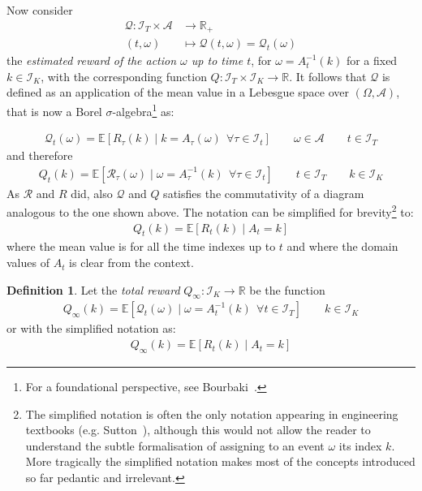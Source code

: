 \documentclass[]{scrartcl}
\theoremstyle{definition}
\newtheorem{definition}{Definition}[section]
\begin{document}
Now consider
\begin{align*}
    \mathcal{Q} : \mathcal{I}_T \times \mathcal{A} &\longrightarrow \mathbb{R}_{+} \\
        (t, \omega) &\longmapsto \mathcal{Q}(t, \omega) = \mathcal{Q}_t(\omega)
\end{align*}
the \emph{estimated reward of the action $\omega$ up to time $t$}, for $\omega = A_t^{-1}(k)$ for a fixed $k\in \mathcal{I}_K$, with the corresponding function $Q: \mathcal{I}_T \times \mathcal{I}_K \rightarrow \mathbb{R}$. It follows that $\mathcal{Q}$ is defined as an application of the mean value in a Lebesgue space over $(\Omega, \mathcal{A})$, that is now a Borel $\sigma$-algebra\footnote{
    For a foundational perspective, see Bourbaki~\cite{bourbaki2004integration}.
} as:

\begin{align}\label{def:mathcalQt}
\mathcal{Q}_t(\omega) = \mathbb{E} \left[ R_{\tau}(k)\mid k = A_{\tau}(\omega)~~ \forall \tau \in \mathcal{I}_t \right]
\qquad
\omega \in \mathcal{A}
\qquad
t \in \mathcal{I}_T
\end{align}
and therefore
\begin{align}\label{def:Qt}
Q_t(k) = \mathbb{E} \left[ \mathcal{R}_{\tau}(\omega)\mid \omega = A_{\tau}^{-1}(k)~~ \forall \tau \in \mathcal{I}_t \right]
\qquad
t \in \mathcal{I}_T
\qquad
k \in \mathcal{I}_K
\end{align}
As $\mathcal{R}$ and $R$ did, also $\mathcal{Q}$ and $Q$ satisfies the commutativity of a diagram analogous to the one shown above. The notation can be simplified for brevity\footnote{
    The simplified notation is often the only notation appearing in engineering textbooks (e.g. Sutton~\cite{sutton2018reinforcement}), although this would not allow the reader to understand the subtle formalisation of assigning to an event $\omega$ its index $k$. More tragically the simplified notation makes most of the concepts introduced so far pedantic and irrelevant.
} to:
\begin{align}\label{def:mathcalQt_simple}
Q_t(k) = \mathbb{E} \left[ R_{t}(k) \mid A_{t} = k \right]
\end{align}
where the mean value is for all the time indexes up to $t$ and where the domain values of $A_t$ is clear from the context.

\begin{definition}
    Let the \emph{total reward} $Q_{\infty}: \mathcal{I}_K \rightarrow \mathbb{R}$ be the function
    \begin{align}\label{def:mathcalQinf}
    Q_{\infty}(k) = \mathbb{E} \left[ \mathcal{Q}_{t}(\omega) \mid \omega = A^{-1}_{t}(k)~~ \forall t \in \mathcal{I}_T \right]
    \qquad
    k \in \mathcal{I}_K
    \end{align}
    or with the simplified notation as:
    \begin{align}\label{def:mathcalQinf_simple}
    Q_{\infty}(k) = \mathbb{E} \left[ R_{t}(k) \mid A_{t} = k \right]
    \end{align}
\end{definition}
\end{document}

